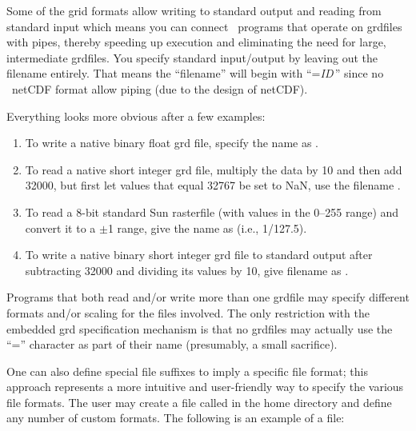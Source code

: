 Some of the grid formats allow writing to standard output and reading
from standard input which means you can connect \GMT\ programs that
operate on grdfiles with pipes, thereby speeding up execution and
eliminating the need for large, intermediate grdfiles.  You specify
standard input/output by leaving out the filename entirely.
That means the ``filename'' will begin with
``=\emph{ID}\,'' since no \GMT\  netCDF format 
allow piping (due to the design of netCDF). 

Everything looks more obvious after a few examples: 

\begin{enumerate}
\item To write a native binary float grd file, specify the name as .

\item To read a native short integer grd file, multiply the data by 10 and then
add 32000, but first let values that equal 32767 be set to NaN,
use the filename . 

\item To read a 8-bit standard Sun rasterfile (with values in the 0--255 range)
and convert it to a $\pm$1 range, give the name as
 (i.e., 1/127.5).

\item To write a native binary short integer grd file to standard output after subtracting
32000 and dividing its values by 10, give filename as . 

\end{enumerate} 

Programs that both read and/or write more than one grdfile may
specify different formats and/or scaling for the files involved.
The only restriction with the embedded grd specification mechanism
is that no grdfiles may actually use the ``=''
character as part of their name (presumably, a small sacrifice). 


One can also define special file suffixes to imply a specific file
format; this approach represents a more intuitive and user-friendly
way to specify the various file formats.  The user may create a file
called  in the home directory and define any
number of custom formats.  The following is an example of a
 file:

\vspace{\baselineskip} 

